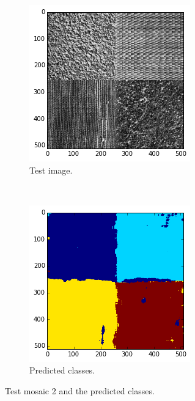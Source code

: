\documentclass[a4paper]{article}
\begin{document}
\begin{figure}
    \centering
    \begin{subfigure}[b]{0.23\textwidth}
        \centering
        \includegraphics[width=\textwidth]{mosaic2_test.png}
        \caption{%
            Test image.
        }
    \end{subfigure}
    ~
    \begin{subfigure}[b]{0.23\textwidth}
        \centering
        \includegraphics[width=\textwidth]{mosaic2_pred.png}
        \caption{%
            Predicted classes.
        }
    \end{subfigure}
    \caption{%
        Test mosaic 2 and the predicted classes.
    }
    \label{fig:test2}
\end{figure}
\end{document}
